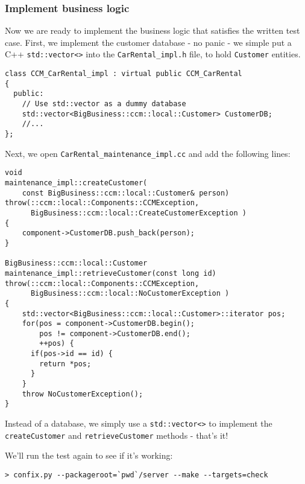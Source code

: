 \subsubsection{Implement business logic}

Now we are ready to implement the business logic that satisfies the written 
test case. 
First, we implement the customer database - no panic - we 
simple put a C++ {\tt std::vector<>} into the {\tt CarRental\_impl.h} file,
to hold {\tt Customer} entities.

\begin{small}
\begin{verbatim}
class CCM_CarRental_impl : virtual public CCM_CarRental
{
  public:
    // Use std::vector as a dummy database
    std::vector<BigBusiness::ccm::local::Customer> CustomerDB;
    //...
};
\end{verbatim}
\end{small}

Next, we open {\tt CarRental\_maintenance\_impl.cc} and add the following 
lines:
\begin{small}
\begin{verbatim}
void
maintenance_impl::createCustomer(
    const BigBusiness::ccm::local::Customer& person)
throw(::ccm::local::Components::CCMException,
      BigBusiness::ccm::local::CreateCustomerException )
{
    component->CustomerDB.push_back(person);
}

BigBusiness::ccm::local::Customer
maintenance_impl::retrieveCustomer(const long id)
throw(::ccm::local::Components::CCMException,
      BigBusiness::ccm::local::NoCustomerException )
{
    std::vector<BigBusiness::ccm::local::Customer>::iterator pos;
    for(pos = component->CustomerDB.begin(); 
        pos != component->CustomerDB.end(); 
        ++pos) {
      if(pos->id == id) {
        return *pos;
      }
    }
    throw NoCustomerException();
}
\end{verbatim}
\end{small}

Instead of a database, we simply use a {\tt std::vector<>} to implement
the {\tt createCustomer} and {\tt retrieveCustomer} methods - that's it! 

We'll run the test again to see if it's working:
\begin{small}
\begin{verbatim}
> confix.py --packageroot=`pwd`/server --make --targets=check
\end{verbatim}
\end{small}

